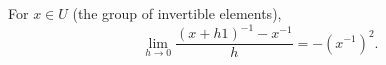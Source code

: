 For $x \in U$ (the group of invertible elements),
$$\lim_{h \to 0} \frac{(x + h1)^{-1} - x^{-1}}{h} = -(x^{-1})^2.$$
